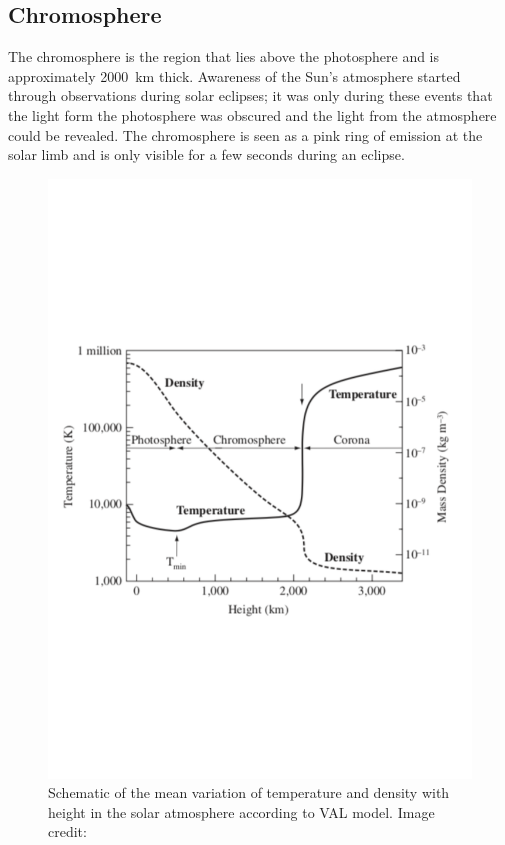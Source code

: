 \subsection{Chromosphere}
\label{Chp1_atmosphere_chromosphere}
The chromosphere is the region that lies above the photosphere and is approximately 2000~km thick. Awareness of the Sun's atmosphere started through observations during solar eclipses; it was only during these events that the light form the photosphere was obscured and the light from the atmosphere could be revealed. The chromosphere is seen as a pink ring of emission at the solar limb and is only visible for a few seconds during an eclipse.

\begin{figure}
    \centering
    \includegraphics[scale=0.5]{Figures/1-Introduction/val_model_MHD_of_Sun_textbook.pdf}
    \caption[VAL model that shows the mean variation of temperature and density with height in the solar atmosphere]{Schematic of the mean variation of temperature and density with height in the solar atmosphere according to VAL model. Image credit: \citet{Priest_2014_MHD_sun}}
    \label{fig:val_model}
\end{figure}


